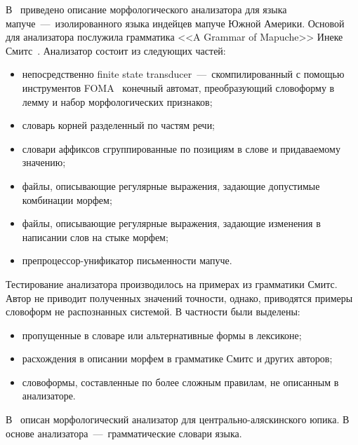 В~\cite{chandia2022fstmorphologicalanalysergenerator} приведено описание морфологического анализатора для языка мапуче~---~изолированного языка индейцев мапуче Южной Америки. Основой для анализатора послужила грамматика <<A Grammar of Mapuche>> Инеке Смитс~\cite{smeets2008}. Анализатор состоит из следующих частей:
\begin{itemize}
	\item непосредственно finite state transducer~---~скомпилированный с помощью инструментов FOMA~\cite{hulden2009foma} конечный автомат, преобразующий словоформу в лемму и набор морфологических признаков;
	\item словарь корней разделенный по частям речи;
	\item словари аффиксов сгруппированные по позициям в слове и придаваемому значению;
	\item файлы, описывающие регулярные выражения, задающие допустимые комбинации морфем;
	\item файлы, описывающие регулярные выражения, задающие изменения в написании слов на стыке морфем;
	\item препроцессор-унификатор письменности мапуче.
\end{itemize}

Тестирование анализатора производилось на примерах из грамматики Смитс. Автор не приводит полученных значений точности, однако, приводятся примеры словоформ не распознанных системой. В частности были выделены:
\begin{itemize}
	\item пропущенные в словаре или альтернативные формы в лексиконе;
	\item расхождения в описании морфем в грамматике Смитс и других авторов;
	\item словоформы, составленные по более сложным правилам, не описанным в анализаторе.
\end{itemize}

В~\cite{strunk2020} описан морфологический анализатор для центрально-аляскинского юпика. В основе анализатора~---~грамматические словари языка. 


